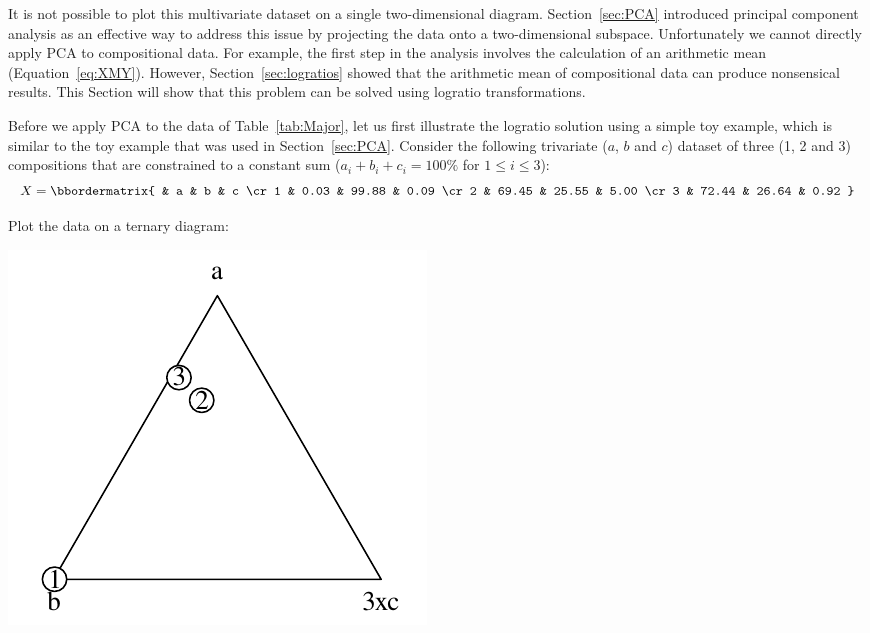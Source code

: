 It is not possible to plot this multivariate dataset on a single
two-dimensional diagram. Section~\ref{sec:PCA} introduced principal
component analysis as an effective way to address this issue by
projecting the data onto a two-dimensional subspace. Unfortunately we
cannot directly apply PCA to compositional data. For example, the
first step in the analysis involves the calculation of an arithmetic
mean (Equation~\ref{eq:XMY}). However, Section~\ref{sec:logratios}
showed that the arithmetic mean of compositional data can produce
nonsensical results. This Section will show that this problem can be
solved using logratio transformations.\medskip

Before we apply PCA to the data of Table~\ref{tab:Major}, let us first
illustrate the logratio solution using a simple toy example, which is
similar to the toy example that was used in
Section~\ref{sec:PCA}. Consider the following trivariate ($a$, $b$ and
$c$) dataset of three (1, 2 and 3) compositions that are constrained
to a constant sum ($a_i+b_i+c_i=100\%$ for $1\leq{i}\leq{3}$):
\begin{equation}
  X =
  \bbordermatrix{ & a & b & c \cr
   1 & 0.03 & 99.88 & 0.09 \cr
   2 & 69.45 & 25.55 & 5.00 \cr
   3 & 72.44 & 26.64 & 0.92
  }
  \label{eq:Xcomp}
\end{equation}

Plot the data on a ternary diagram:

\noindent\begin{minipage}[t][][b]{.3\textwidth}
\includegraphics[]{../figures/abc.pdf}\medskip
\end{minipage}
\begin{minipage}[t][][t]{.7\textwidth}
  \label{fig:abc}
\end{minipage}

